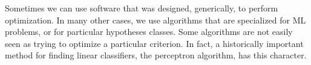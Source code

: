 Sometimes we can use software that was designed, generically, to
perform optimization.  In many other cases, we use algorithms that are
specialized for ML problems, or for particular
hypotheses classes.
Some algorithms are not easily seen as trying to optimize a particular
criterion.  In fact, a historically important method for finding linear
classifiers, the perceptron algorithm, has this character.


